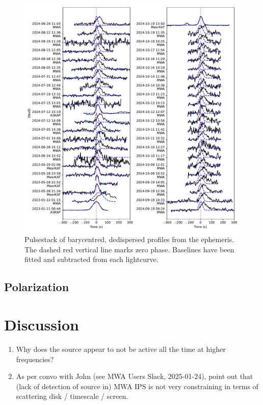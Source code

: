 \documentclass[preprint2,linenumbers]{aastex631}
\begin{document}
\begin{figure}[pt]
    \centering
    \includegraphics[width=0.9\linewidth]{pulsestack.pdf}
    \caption{Pulsestack of barycentred, dedispersed profiles from the ephemeris. The dashed red vertical line marks zero phase. Baselines have been fitted and subtracted from each lightcurve.}
    \label{fig:pulsestack}
\end{figure}

\subsection{Polarization} \label{sec:polarization}

\section{Discussion} \label{sec:discussion}

\begin{enumerate}
    \item Why does the source appear to not be active all the time at higher frequencies?
    \item As per convo with John (see MWA Users Slack, 2025-01-24), point out that (lack of detection of source in) MWA IPS is not very constraining in terms of scattering disk / timescale / screen.
\end{enumerate}
\end{document}
